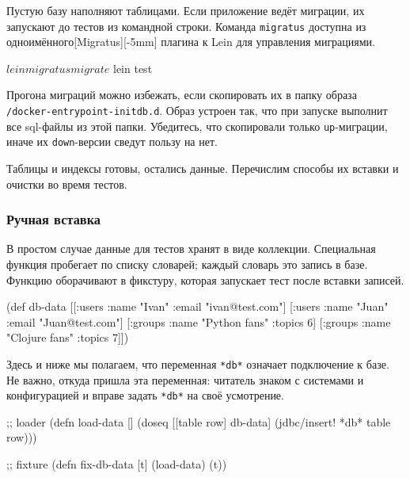 Пустую базу наполняют таблицами. Если приложение ведёт миграции, их запускают до
тестов из командной строки. Команда \verb|migratus| доступна из
одноимённого[Migratus][-5mm] плагина к
Lein для управления миграциями.

\begin{english}
  \begin{clojure}
$ lein migratus migrate
$ lein test
  \end{clojure}
\end{english}

Прогона миграций можно избежать, если скопировать их в папку образа
\verb|/docker-entrypoint-initdb.d|. Образ устроен так, что при запуске
выполнит все sql-файлы из этой папки. Убедитесь, что скопировали только
\verb|up|-миграции, иначе их \verb|down|-версии сведут пользу на нет.

Таблицы и индексы готовы, остались данные. Перечислим способы их вставки и
очистки во время тестов.

\subsubsection*{Ручная вставка}

В простом случае данные для тестов хранят в виде коллекции. Специальная функция
пробегает по списку словарей; каждый словарь это запись в базе. Функцию
оборачивают в фикстуру, которая запускает тест после вставки записей.

\begin{english}
  \begin{clojure}
(def db-data
  [[:users {:name "Ivan" :email "ivan@test.com"}]
   [:users {:name "Juan" :email "Juan@test.com"}]
   [:groups {:name "Python fans" :topics 6}]
   [:groups {:name "Clojure fans" :topics 7}]])
  \end{clojure}
\end{english}


Здесь и ниже мы полагаем, что переменная \verb|*db*| означает подключение к
базе. Не важно, откуда пришла эта переменная: читатель знаком с системами и
конфигурацией и вправе задать \verb|*db*| на своё усмотрение.

\begin{english}
  \begin{clojure}
;; loader
(defn load-data []
  (doseq [[table row] db-data]
    (jdbc/insert! *db* table row)))

;; fixture
(defn fix-db-data [t]
  (load-data)
  (t))
  \end{clojure}
\end{english}

